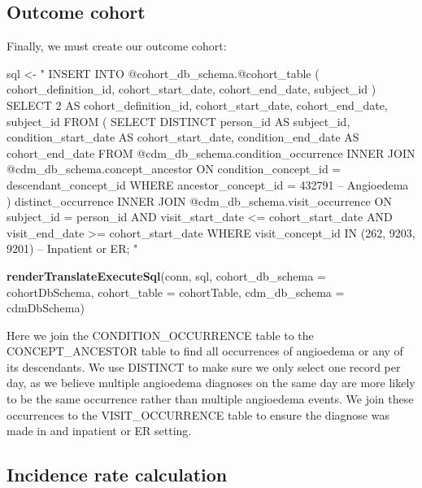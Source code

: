 \documentclass[11pt]{book}
\newenvironment{Shaded}{\begin{snugshade}}{\end{snugshade}}
\newcommand{\KeywordTok}[1]{\textcolor[rgb]{0.13,0.29,0.53}{\textbf{#1}}}
\newcommand{\DataTypeTok}[1]{\textcolor[rgb]{0.13,0.29,0.53}{#1}}
\newcommand{\StringTok}[1]{\textcolor[rgb]{0.31,0.60,0.02}{#1}}
\newcommand{\NormalTok}[1]{#1}
\begin{document}
\subsection{Outcome cohort}\label{outcome-cohort}

Finally, we must create our outcome cohort:

\begin{Shaded}
\begin{Highlighting}[]
\NormalTok{sql <-}\StringTok{ "}
\StringTok{INSERT INTO @cohort_db_schema.@cohort_table (}
\StringTok{ cohort_definition_id,}
\StringTok{ cohort_start_date,}
\StringTok{ cohort_end_date,}
\StringTok{subject_id}
\StringTok{)}
\StringTok{SELECT 2 AS cohort_definition_id,}
\StringTok{  cohort_start_date,}
\StringTok{  cohort_end_date,}
\StringTok{  subject_id}
\StringTok{FROM (}
\StringTok{  SELECT DISTINCT person_id AS subject_id,}
\StringTok{    condition_start_date AS cohort_start_date,}
\StringTok{    condition_end_date AS cohort_end_date}
\StringTok{  FROM @cdm_db_schema.condition_occurrence}
\StringTok{  INNER JOIN @cdm_db_schema.concept_ancestor}
\StringTok{    ON condition_concept_id = descendant_concept_id}
\StringTok{  WHERE ancestor_concept_id = 432791 -- Angioedema}
\StringTok{) distinct_occurrence}
\StringTok{INNER JOIN @cdm_db_schema.visit_occurrence}
\StringTok{  ON subject_id = person_id}
\StringTok{  AND visit_start_date <= cohort_start_date}
\StringTok{  AND visit_end_date >= cohort_start_date}
\StringTok{WHERE visit_concept_id IN (262, 9203,}
\StringTok{    9201) -- Inpatient or ER;}
\StringTok{"}

\KeywordTok{renderTranslateExecuteSql}\NormalTok{(conn, sql,}
                          \DataTypeTok{cohort_db_schema =}\NormalTok{ cohortDbSchema,}
                          \DataTypeTok{cohort_table =}\NormalTok{ cohortTable,}
                          \DataTypeTok{cdm_db_schema =}\NormalTok{ cdmDbSchema)}
\end{Highlighting}
\end{Shaded}

Here we join the CONDITION\_OCCURRENCE table to the CONCEPT\_ANCESTOR
table to find all occurrences of angioedema or any of its descendants.
We use DISTINCT to make sure we only select one record per day, as we
believe multiple angioedema diagnoses on the same day are more likely to
be the same occurrence rather than multiple angioedema events. We join
these occurrences to the VISIT\_OCCURRENCE table to ensure the diagnose
was made in and inpatient or ER setting.

\subsection{Incidence rate
calculation}\label{incidence-rate-calculation}
\end{document}
